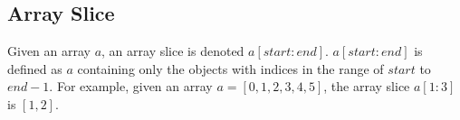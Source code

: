 \subsection{Array Slice}
Given an array $a$, an array slice is denoted $a[start:end]$. $a[start:end]$ is defined as $a$ containing only the objects with indices in the range of $start$ to $end-1$. For example, given an array $a=[0,1,2,3,4,5]$, the array slice $a[1:3]$ is $[1,2]$. \autocite{Castro.2010}